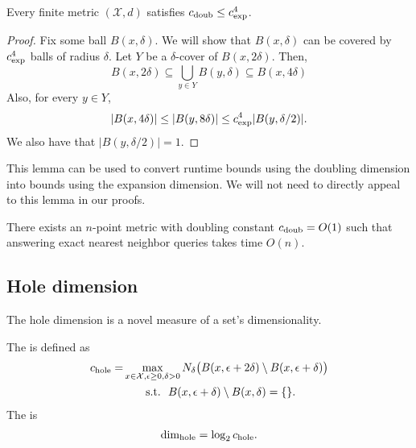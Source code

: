 \documentclass[thesis.tex]{subfiles}
\newcommand{\set}[1]{\mathcal {#1}}
\newcommand{\krdim}{\text{dim}_\textnormal{exp}}
\newcommand{\doubdim}{\text{dim}_\textnormal{doub}}
\newcommand{\holedim}{\text{dim}_{\textnormal{hole}}}
\newcommand{\cexp}{c_\textnormal{exp}}
\newcommand{\cdoub}{c_\textnormal{doub}}
\newcommand{\chole}{c_\textnormal{hole}}
\begin{document}
\begin{lemma}
    Every finite metric $(\set X,d)$ satisfies
    $\cdoub \le \cexp^4$.
\end{lemma}
\begin{proof}
    Fix some ball $B(x,\delta)$.
    We will show that $B(x,\delta)$ can be covered by $\cexp^4$ balls of radius $\delta$.
    Let $Y$ be a $\delta$-cover of $B(x,2\delta)$.
    Then,
    \begin{equation}
        B(x,2\delta) 
        \subseteq 
        \bigcup\limits_{y\in Y} B(y,\delta) 
        \subseteq
        B(x,4\delta)
    \end{equation}
    Also, for every $y\in Y$,
    \begin{equation}
        |B(x,4\delta)| 
        \le 
        |B(y,8\delta)| 
        \le 
        \cexp^4 |B(y,\delta/2)|
        .
    \end{equation}
    We also have that $|B(y,\delta/2)|=1$.
\end{proof}

\noindent
This lemma can be used to convert runtime bounds using the doubling dimension into bounds using the expansion dimension.
We will not need to directly appeal to this lemma in our proofs.

\begin{theorem}
    \label{theorem:exactdoubling}
    There exists an $n$-point metric with doubling constant $\cdoub=O(1)$ such that answering exact nearest neighbor queries takes time $O(n)$.
\end{theorem}


\subsection{Hole dimension}

The hole dimension is a novel measure of a set's dimensionality.

The  is defined as
\begin{align}
    \chole
    = 
    &\max_{x\in\set X, \epsilon \ge 0, \delta > 0} 
    N_\delta\big( B(x,\epsilon+2\delta) \setminus B(x,\epsilon+\delta) \big)
    \\
    &
    ~~~~~~\text{s.t.}
    ~~
    B(x,\epsilon+\delta) \setminus B(x,\delta) = \{\}
    .
\end{align}
The  is
\begin{align}
    \holedim = \log_2 \chole
    .
\end{align}
\end{document}
